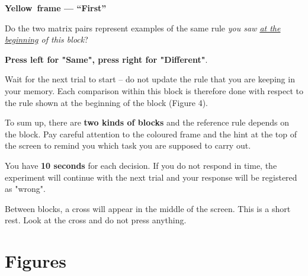 \documentclass[11pt]{article}
\newcommand{\MemColorName}{}
\renewcommand{\MemColorName}{Cyan}
\renewcommand{\MemColorName}{Yellow}
\begin{document}
\vspace{0.2cm}

\begin{membox}
\textbf{\MemColorName\ frame --- ``First''}

Do the two matrix pairs represent examples of the same rule \textit{you saw \underline{at the beginning} of this block}? 

\vspace{0.2cm}
{

\centering
\textbf{Press left for "Same", press right for "Different"}.

}

\vspace{0.2cm}


Wait for the next trial to start -- do not update the rule that you are keeping in your memory. Each comparison within this block is therefore done with respect to the rule shown at the beginning of the block (Figure 4).

\end{membox}

\vspace{0.2cm}
To sum up, there are \textbf{two kinds of blocks} and the reference rule depends on the block. Pay careful attention to the coloured frame and the hint at the top of the screen to remind you which task you are supposed to carry out.
\vspace{0.6cm}

You have \textbf{10 seconds} for each decision. If you do not respond in time, the experiment will continue with the next trial and your response will be registered as "wrong".

Between blocks, a cross will appear in the middle of the screen. This is a short rest. Look at the cross and do not press anything.

\newpage

\section{Figures}
\end{document}

